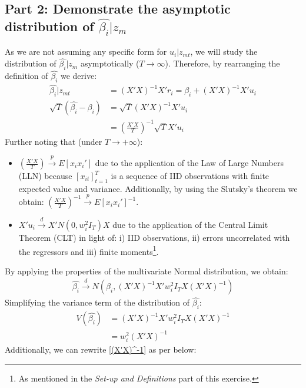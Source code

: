 \documentclass[]{article}
\begin{document}
\subsection{Part 2: Demonstrate the asymptotic distribution of $\hat{\beta_i}|z_m$}
As we are not assuming any specific form for $u_i|z_{mt}$, we will study the distribution of $\hat{\beta_i}|z_m$ asymptotically ($T \to \infty$). Therefore, by rearranging the definition of $\hat{\beta_i}$ we derive:  
\begin{align*}
	\hat{\beta_i} | z_{mt} &= (X'X)^{-1}X'r_i = \beta_i + (X'X)^{-1}X'u_i \\
	\sqrt{T}(\hat{\beta_i} -\beta_i) &= \sqrt{T}(X'X)^{-1}X'u_i \\
	&= (\frac{X'X}{T})^{-1}\sqrt{T}X'u_i 
\end{align*}
Further noting that (under $T \to +\infty$):
\begin{itemize}
	\item $(\frac{X'X}{T}) \overset{p}{\to} E[x_ix_i']$ due to the application of the Law of Large Numbers (LLN) because $[x_{it}]_{t=1}^T$ is a sequence of IID observations with finite expected value and variance. Additionally, by using the Slutsky's theorem we obtain: $(\frac{X'X}{T})^{-1} \overset{p}{\to} E[x_ix_i']^{-1}$. 	
	\item $X'u_i \overset{d}{\to} X'N(0,w_i^2I_T)X$ due to the application of the Central Limit Theorem (CLT) in light of: i) IID observations, ii) errors uncorrelated with the regressors and iii) finite moments\footnote{As mentioned in the \textit{Set-up and Definitions} part of this exercise.}.
\end{itemize}
By applying the properties of the multivariate Normal distribution, we obtain:
\begin{align*}
	\hat{\beta_i} \overset{d}{\to} N(\beta_i, (X'X)^{-1}X'w_i^2I_TX(X'X)^{-1})
\end{align*}
Simplifying the variance term of the distribution of $\hat{\beta_i}$:
\begin{align*}
	V(\hat{\beta_i}) &= (X'X)^{-1}X'w_i^2I_TX(X'X)^{-1} \\
	&= w_i^2 (X'X)^{-1}
\end{align*}
Additionally, we can rewrite \ref{(X'X)^-1} as per below:
\end{document}
